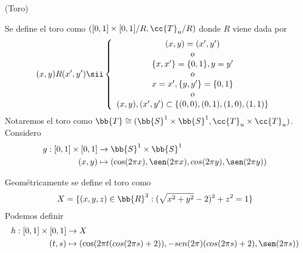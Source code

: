  \begin{ejemplo}(Toro)

    Se define el toro como $([0,1]\times [0,1]/R, \cc{T}_u/R)$ donde $R$ viene dada por 
    \begin{align*}
        (x,y)R(x',y') \sii \left\{
        \begin{array}{c}
            (x,y)=(x',y')\\
            o\\
            \{x,x'\}=\{0,1\}, y=y'\\
            o\\
            x=x', \{y,y'\}=\{0,1\}\\
            o\\
            (x,y),(x',y')\subset\{(0,0),(0,1),(1,0),(1,1)\}
        \end{array}
        \right.
    \end{align*}
    Notaremos el toro como $\bb{T}\cong (\bb{S}^1\times \bb{S}^1, \cc{T}_u\times \cc{T}_u)$. Considero 
    \begin{align*}
        g:[0,1]\times [0,1] &\to \bb{S}^1\times \bb{S}^1\\
        (x,y) &\mapsto (\cos(2\pi x), \sen(2\pi x), cos(2\pi y), \sen(2\pi y))
    \end{align*}

    Geométricamente se define el toro como 
    \begin{align*}
        X=\{(x,y,z)\in \bb{R}^3 : (\sqrt{x^2+y^2}-2)^2 + z^2 = 1\}
    \end{align*}
    Podemos definir
    \begin{align*}
        h:[0,1]\times [0,1] &\to X\\
        (t,s) & \mapsto (\cos(2\pi t (cos(2\pi s) +2)), -sen(2\pi) (cos(2\pi s)+2), \sen(2\pi s))
    \end{align*}
    \endsquare
 \end{ejemplo}

